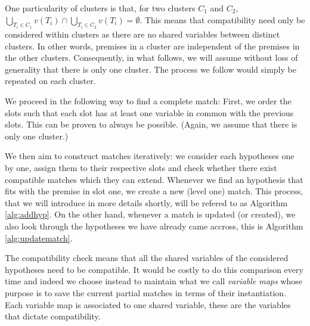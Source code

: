 \documentclass[runningheads]{llncs}
\newcommand{\xcom}[1]{{\color{cyan}{Xavier: #1}} }
\begin{document}

One particularity of clusters is that, for two clusters $C_1$ and $C_2$,
$\bigcup_{T_i \in C_1} v(T_i) \cap \bigcup_{T_i \in C_2} v(T_i) = \emptyset$.
This means that compatibility need only be considered within clusters as there are no shared variables between distinct clusters.
In other words, premises in a cluster are independent of the premises in the other clusters.
Consequently, in what follows, we will assume without loss of generality that there is only one cluster.
The process we follow would simply be repeated on each cluster.

We proceed in the following way to find a complete match:
First, we order the slots such that each slot has at least one variable in common with the previous slots.
This can be proven to always be possible.
(Again, we assume that there is only one cluster.)
\xcom{We can add the proof if we want to / have space.}

We then aim to construct matches iteratively: we consider each hypotheses one by one, assign them to their respective slots and check whether there exist compatible matches which they can extend.
Whenever we find an hypothesis that fits with the premise in slot one, we create a new (level one) match.
This process, that we will introduce in more details shortly, will be refered to as Algorithm \ref{alg:addhyp}.
On the other hand, whenever a match is updated (or created), we also look through the hypotheses we have already came accross, this is Algorithm \ref{alg:updatematch}.

The compatibility check means that all the shared variables of the considered hypotheses need to be compatible.
It would be costly to do this comparison every time and indeed we choose instead to maintain what we call \textit{variable maps} whose purpose is to save the current partial matches in terms of their instantiation.
Each variable map is associated to one shared variable, these are the variables that dictate compatibility.
\end{document}
